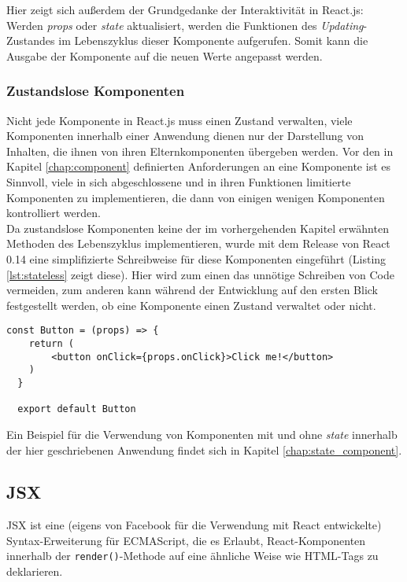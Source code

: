 Hier zeigt sich außerdem der Grundgedanke der Interaktivität in React.js: Werden \textit{props} oder \textit{state} aktualisiert, werden die Funktionen des \textit{Updating}-Zustandes im Lebenszyklus dieser Komponente aufgerufen. Somit kann die Ausgabe der Komponente auf die neuen Werte angepasst werden.

\subsubsection{Zustandslose Komponenten}
\label{chap:stateless}
Nicht jede Komponente in React.js muss einen Zustand verwalten, viele Komponenten innerhalb einer Anwendung dienen nur der Darstellung von Inhalten, die ihnen von ihren Elternkomponenten übergeben werden. Vor den in Kapitel \ref{chap:component} definierten Anforderungen an eine Komponente ist es Sinnvoll, viele in sich abgeschlossene und in ihren Funktionen limitierte Komponenten zu implementieren, die dann von einigen wenigen Komponenten kontrolliert werden.\\
Da zustandslose Komponenten keine der im vorhergehenden Kapitel erwähnten Methoden des Lebenszyklus implementieren, wurde mit dem Release von React 0.14\footnotemark{} eine simplifizierte Schreibweise für diese Komponenten eingeführt (Listing \ref{lst:stateless} zeigt diese). Hier wird zum einen das unnötige Schreiben von Code vermeiden, zum anderen kann während der Entwicklung auf den ersten Blick festgestellt werden, ob eine Komponente einen Zustand verwaltet oder nicht.


\begin{lstlisting}[caption={Simplifizierte Schreibweise für Komponenten ohne \textit{state}}, label=lst:stateless]
  const Button = (props) => {
  	return (
  		<button onClick={props.onClick}>Click me!</button>
  	)
  }

  export default Button
\end{lstlisting}

Ein Beispiel für die Verwendung von Komponenten mit und ohne \textit{state} innerhalb der hier geschriebenen Anwendung findet sich in Kapitel \ref{chap:state_component}.

\subsection{JSX}
\label{chap:jsx}
JSX ist eine (eigens von Facebook für die Verwendung mit React entwickelte) Syntax-Erweiterung für ECMAScript, die es Erlaubt, React-Komponenten innerhalb der \verb|render()|-Methode auf eine ähnliche Weise wie HTML-Tags zu deklarieren.

